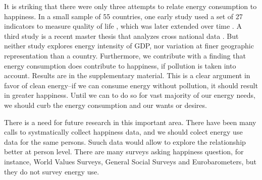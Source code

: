 \documentclass[10pt, letterpaper]{article}
\begin{document}
\begin{spacing}{1.4}
It is striking that there were only three  attempts to
relate energy consumption to happiness.   %
 In a small sample of 55 countries, one early study used a set of 27 indicators to measure
 quality of life \cite{mazur74}, which was later extended over time \cite{mazur11}.
 A third study is a recent master
 thesis that  analyzes cross national data \cite{winfrey13}. But neither
 study  explores energy intensity of GDP, nor variation at finer geographic representation than a country.
Furthermore, we contribute with a finding that energy consumption does contribute to happiness, if pollution is
taken into account. Results are in the supplementary material. This is a clear argument in favor of clean energy--if we can
consume energy without pollution, it should result in greater happiness. Until
we can to do so for vast majority of our energy needs, we should curb the energy consumption and
our wants or desires.

There is a need for future research in this important area. There have been many
calls to systmatically collect happiness data, and we should colect energy use data for the same persons. Suuch data would allow
to explore the relationship better at person level. There are many surveys
asking happiness question, for instance, World Values Surveys, General Social
Surveys and Eurobarometers, but they do not survey energy use. 




\end{spacing}
\end{document}
